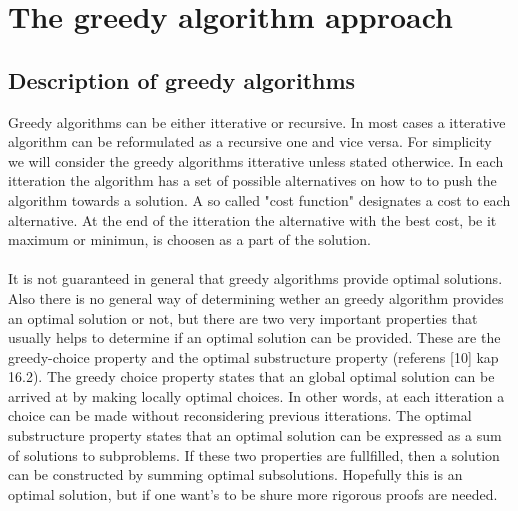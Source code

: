 \section{The greedy algorithm approach}
\subsection{Description of greedy algorithms}

Greedy algorithms can be either itterative or recursive. In most cases a itterative algorithm can be reformulated as a recursive one and vice versa. For simplicity we will consider the greedy algorithms itterative unless stated otherwice. In each itteration the algorithm has a set of possible alternatives on how to to push the algorithm towards a solution. A so called "cost function" designates a cost to each alternative. At the end of the itteration the alternative with the best cost, be it maximum or minimun, is choosen as a part of the solution. \\
\\It is not guaranteed in general that greedy algorithms provide optimal solutions. Also there is no general way of determining wether an greedy algorithm provides an optimal solution or not, but there are two very important properties that usually helps to determine if an optimal solution can be provided. These are the greedy-choice property and the optimal substructure property (referens [10] kap 16.2). The greedy choice property states that an global optimal solution can be arrived at by making locally optimal choices. In other words, at each itteration a choice can be made without reconsidering previous itterations. The optimal substructure property states that an optimal solution can be expressed as a sum of solutions to subproblems. If these two properties are fullfilled, then a solution can be constructed by summing optimal subsolutions. Hopefully this is an optimal solution, but if one want's to be shure more rigorous proofs are needed. 


